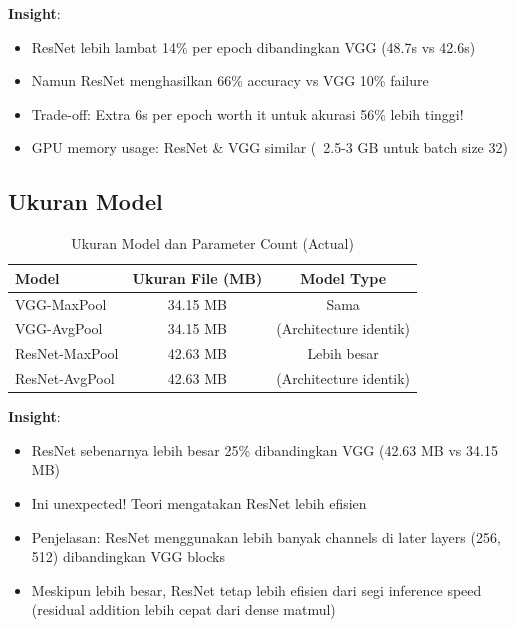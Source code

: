 \documentclass[12pt,a4paper]{report}
\begin{document}
\vspace{0.5cm}

\textbf{Insight}:

\begin{itemize}
    \item ResNet lebih lambat 14\% per epoch dibandingkan VGG (48.7s vs 42.6s)
    \item Namun ResNet menghasilkan 66\% accuracy vs VGG 10\% failure
    \item Trade-off: Extra 6s per epoch worth it untuk akurasi 56\% lebih tinggi!
    \item GPU memory usage: ResNet \& VGG similar (~2.5-3 GB untuk batch size 32)
\end{itemize}

\subsection{Ukuran Model}

\begin{table}[H]
\centering
\caption{Ukuran Model dan Parameter Count (Actual)}
\begin{tabular}{|l|c|c|}
\hline
\textbf{Model} & \textbf{Ukuran File (MB)} & \textbf{Model Type} \\
\hline
VGG-MaxPool & 34.15 MB & Sama \\
\hline
VGG-AvgPool & 34.15 MB & (Architecture identik) \\
\hline
ResNet-MaxPool & 42.63 MB & Lebih besar \\
\hline
ResNet-AvgPool & 42.63 MB & (Architecture identik) \\
\hline
\end{tabular}
\end{table}

\vspace{0.5cm}

\textbf{Insight}:

\begin{itemize}
    \item ResNet sebenarnya lebih besar 25\% dibandingkan VGG (42.63 MB vs 34.15 MB)
    \item Ini unexpected! Teori mengatakan ResNet lebih efisien
    \item Penjelasan: ResNet menggunakan lebih banyak channels di later layers (256, 512) dibandingkan VGG blocks
    \item Meskipun lebih besar, ResNet tetap lebih efisien dari segi inference speed (residual addition lebih cepat dari dense matmul)
\end{itemize}
\end{document}
